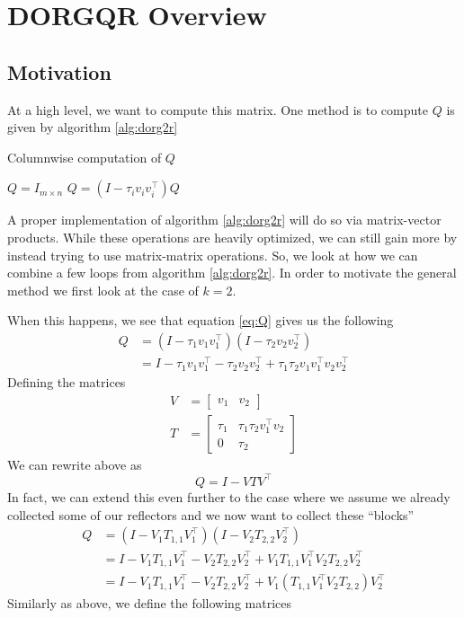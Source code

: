 \documentclass[12pt]{article}
\begin{document}
    \section{DORGQR Overview}
    \subsection{Motivation}
    At a high level, we want to compute this matrix. One method is to compute $Q$ is given by algorithm \ref{alg:dorg2r}

    \begin{algorithm}
        \caption{Columnwise computation of $Q$}\label{alg:dorg2r}
        \begin{algorithmic}[1]
            \STATE $Q= I_{m\times n}$
                \STATE $Q= \left(I-\tau_iv_iv_i^\top\right)Q$
            \ENDFOR
        \end{algorithmic}
    \end{algorithm}

    A proper implementation of algorithm \ref{alg:dorg2r} will do so via matrix-vector products. While these operations
    are heavily optimized, we can still gain more by instead trying to use matrix-matrix
    operations. So, we look at how we can combine a few loops from algorithm \ref{alg:dorg2r}. In order to motivate the general method we first look at the case of $k=2$.

    When this happens, we see that equation \ref{eq:Q} gives us the following
    \begin{align*}
        Q &= \left(I-\tau_1v_1v_1^\top\right)\left(I-\tau_2v_2v_2^\top\right) \\
        &= I - \tau_1v_1v_1^\top - \tau_2v_2v_2^\top + \tau_1\tau_2v_1v_1^\top v_2v_2^\top
    \end{align*}
    Defining the matrices
    \begin{align*}
        V &= \begin{bmatrix} v_1 & v_2 \end{bmatrix} \\
        T &= \begin{bmatrix}
            \tau_1 & \tau_1\tau_2v_1^\top v_2 \\
            0      & \tau_2
        \end{bmatrix}
    \end{align*}
    We can rewrite above as 
    \[
        Q = I - VTV^\top
    \]
    In fact, we can extend this even further to the case where we assume we already collected some of our reflectors and we now want to collect these ``blocks''
    \begin{align*}
        Q &= \left(I - V_1T_{1,1}V_1^\top\right)\left(I - V_2T_{2,2}V_2^\top\right) \\
        &= I - V_1T_{1,1}V_1^\top - V_2T_{2,2}V_2^\top + V_1T_{1,1}V_1^\top V_2T_{2,2}V_2^\top \\
        &= I - V_1T_{1,1}V_1^\top - V_2T_{2,2}V_2^\top + V_1\left(T_{1,1}V_1^\top V_2T_{2,2}\right)V_2^\top 
    \end{align*}
    Similarly as above, we define the following matrices
\end{document}
